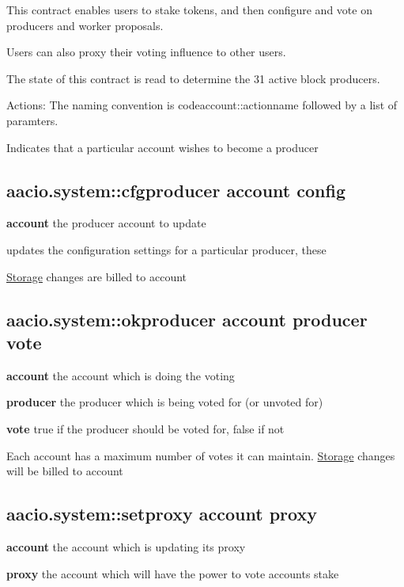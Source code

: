 This contract enables users to stake tokens, and then configure and vote on producers and worker proposals.

Users can also proxy their voting influence to other users.

The state of this contract is read to determine the 31 active block producers.

Actions\+: The naming convention is codeaccount\+::actionname followed by a list of paramters.

Indicates that a particular account wishes to become a producer \subsection*{aacio.\+system\+::cfgproducer account config}


\begin{DoxyItemize}
\item {\bfseries account} the producer account to update
\item updates the configuration settings for a particular producer, these
\end{DoxyItemize}

\mbox{\hyperlink{struct_storage}{Storage}} changes are billed to \textquotesingle{}account\textquotesingle{}

\subsection*{aacio.\+system\+::okproducer account producer vote}


\begin{DoxyItemize}
\item {\bfseries account} the account which is doing the voting
\item {\bfseries producer} the producer which is being voted for (or unvoted for)
\item {\bfseries vote} true if the producer should be voted for, false if not
\end{DoxyItemize}

Each account has a maximum number of votes it can maintain. \mbox{\hyperlink{struct_storage}{Storage}} changes will be billed to \textquotesingle{}account\textquotesingle{}

\subsection*{aacio.\+system\+::setproxy account proxy}


\begin{DoxyItemize}
\item {\bfseries account} the account which is updating it\textquotesingle{}s proxy
\item {\bfseries proxy} the account which will have the power to vote account\textquotesingle{}s stake
\end{DoxyItemize}

